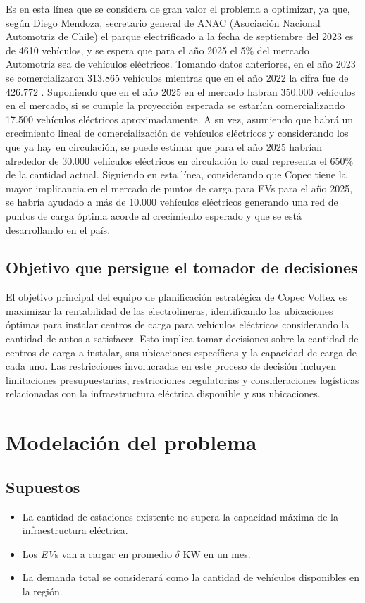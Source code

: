 \documentclass[letterpaper]{article}
\begin{document}
\begin{flushleft}
		Es en esta línea que se considera de gran valor el problema a optimizar, ya que, según Diego Mendoza, secretario general de ANAC (Asociación Nacional Automotriz de Chile) el parque electrificado a la fecha de septiembre del 2023 es de 4610 vehículos, y se espera que para el año 2025 el 5\% del mercado Automotriz sea de vehículos eléctricos. Tomando datos anteriores, en el año 2023 se comercializaron 313.865 vehículos \cite{chileautos} mientras que en el año 2022 la cifra fue de 426.772 \cite{Tercera-1}. Suponiendo que en el año 2025 en el mercado habran 350.000 vehículos en el mercado, si se cumple la proyección esperada se estarían comercializando 17.500 vehículos eléctricos aproximadamente. A su vez, asumiendo que habr\'a un crecimiento lineal de comercializaci\'on de veh\'iculos el\'ectricos y considerando los que ya hay en circulaci\'on, se puede estimar que para el año 2025 habr\'ian alrededor de 30.000 vehículos eléctricos en circulación lo cual representa el 650\% de la cantidad actual. Siguiendo en esta línea, considerando que Copec tiene la mayor implicancia en el mercado de puntos de carga para EVs para el año 2025, se habr\'ia ayudado a más de 10.000 vehículos eléctricos generando una red de puntos de carga óptima acorde al crecimiento esperado y que se está desarrollando en el país.
	\subsection{Objetivo que persigue el tomador de decisiones}
		El objetivo principal del equipo de planificación estratégica de Copec Voltex es maximizar la rentabilidad de las electrolineras, identificando las ubicaciones óptimas para instalar centros de carga para vehículos eléctricos considerando la cantidad de autos a satisfacer. Esto implica tomar decisiones sobre la cantidad de centros de carga a instalar, sus ubicaciones específicas y la capacidad de carga de cada uno. Las restricciones involucradas en este proceso de decisión incluyen limitaciones presupuestarias, restricciones regulatorias y consideraciones logísticas relacionadas con la infraestructura eléctrica disponible y sus ubicaciones.
	
	\section{Modelación del problema}
	\subsection*{Supuestos}
	\begin{itemize}
		\item La cantidad de estaciones existente no supera la capacidad máxima de la infraestructura eléctrica.
		\item Los \textit{EV}s van a cargar en promedio $\delta$ KW en un mes.
		\item La demanda total se considerar\'a como la cantidad de veh\'iculos disponibles en la regi\'on.
	\end{itemize}

\end{flushleft}
\end{document}
